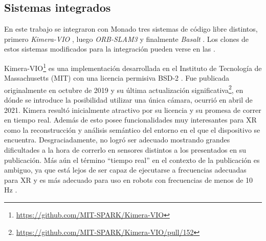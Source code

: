 \documentclass[ twoside,openright,titlepage,numbers=noenddot,%
                headinclude,footinclude,cleardoublepage=empty,abstract=on,
                BCOR=-5mm,paper=a4,fontsize=11pt
                ]{scrreprt}
\begin{document}
\hypertarget{sistemas-integrados}{%
\subsection{Sistemas integrados}\label{sistemas-integrados}}

En este trabajo se integraron con Monado tres sistemas de código libre
distintos, primero \emph{Kimera-VIO}
\autocite{rosinolKimeraOpenSourceLibrary2020}, luego \emph{ORB-SLAM3}
\autocite{camposORBSLAM3AccurateOpenSource2021} y finalmente
\emph{Basalt} \autocite{usenkoBasaltVisualInertialMapping2020}. Los
clones de estos sistemas modificados para la integración pueden verse en
las .

Kimera-VIO\footnote{\url{https://github.com/MIT-SPARK/Kimera-VIO}} es
una implementación desarrollada en el Instituto de Tecnología de
Massachusetts (MIT) con una licencia permisiva BSD-2
\autocite{2ClauseBSDLicense}. Fue publicada originalmente en octubre de
2019 y su última actualización significativa\footnote{\url{https://github.com/MIT-SPARK/Kimera-VIO/pull/152}},
en dónde se introduce la posibilidad utilizar una única cámara, ocurrió
en abril de 2021. Kimera resultó inicialmente atractivo por su licencia
y su promesa de correr en tiempo real. Además de esto posee
funcionalidades muy interesantes para XR como la reconstrucción y
análisis semántico del entorno en el que el dispositivo se encuentra.
Desgraciadamente, no logró ser adecuado mostrando grandes dificultades a
la hora de correrlo en sensores distintos a los presentados en su
publicación. Más aún el término ``tiempo real'' en el contexto de la
publicación es ambiguo, ya que está lejos de ser capaz de ejecutarse a
frecuencias adecuadas para XR y es más adecuado para uso en robots con
frecuencias de menos de 10 Hz \autocite[Fig.
5]{rosinolKimeraOpenSourceLibrary2020}.
\end{document}

